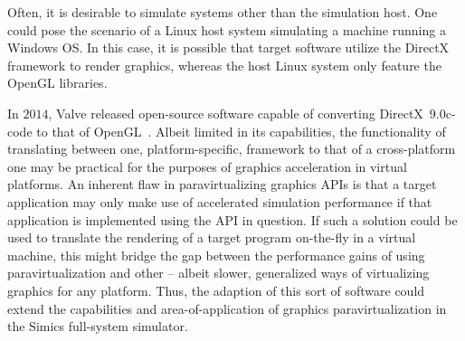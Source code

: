 Often, it is desirable to simulate systems other than the simulation host.
One could pose the scenario of a Linux host system simulating a machine running a Windows OS.
In this case, it is possible that target software utilize the DirectX framework to render graphics, whereas the host Linux system only feature the OpenGL libraries.

In $2014$, Valve released open-source software capable of converting DirectX~$9.0$c-code to that of OpenGL~.
Albeit limited in its capabilities, the functionality of translating between one, platform-specific, framework to that of a cross-platform one may be practical for the purposes of graphics acceleration in virtual platforms.
An inherent flaw in paravirtualizing graphics APIs is that a target application may only make use of accelerated simulation performance if that application is implemented using the API in question.
If such a solution could be used to translate the rendering of a target program on-the-fly in a virtual machine, this might bridge the gap between the performance gains of using paravirtualization and other -- albeit slower, generalized ways of virtualizing graphics for any platform.
Thus, the adaption of this sort of software could extend the capabilities and area-of-application of graphics paravirtualization in the Simics full-system simulator.


